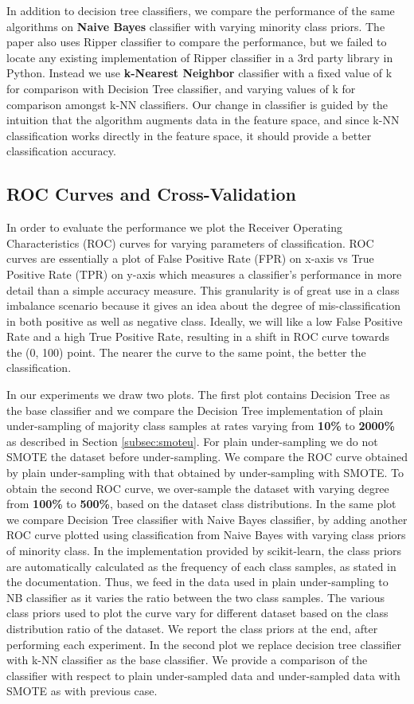 \documentclass[10pt,journal,compsoc]{IEEEtran}
\begin{document}
In addition to decision tree classifiers, we compare the performance of the same algorithms on \textbf{Naive Bayes} classifier with varying minority class priors.
The paper also uses Ripper classifier to compare the performance, but we failed to locate any existing implementation of Ripper classifier in a 3rd party library in Python.
Instead we use \textbf{k-Nearest Neighbor} classifier with a fixed value of k for comparison with Decision Tree classifier, and varying values of k for comparison amongst k-NN classifiers.
Our change in classifier is guided by the intuition that the algorithm augments data in the feature space, and since k-NN classification works directly in the feature space, it should provide a better classification accuracy.

\subsection{ROC Curves and Cross-Validation}
In order to evaluate the performance we plot the Receiver Operating Characteristics (ROC) curves for varying parameters of classification.
ROC curves are essentially a plot of False Positive Rate (FPR) on x-axis vs True Positive Rate (TPR) on y-axis which measures a classifier's performance in more detail than a simple accuracy measure.
This granularity is of great use in a class imbalance scenario because it gives an idea about the degree of mis-classification in both positive as well as negative class.  
Ideally, we will like a low False Positive Rate and a high True Positive Rate, resulting in a shift in ROC curve towards the (0, 100) point. 
The nearer the curve to the same point, the better the classification.

In our experiments we draw two plots. 
The first plot contains Decision Tree as the base classifier and we compare the Decision Tree implementation of plain under-sampling of majority class samples at rates varying from \textbf{10\%} to \textbf{2000\%} as described in Section \ref{subsec:smoteu}. 
For plain under-sampling we do not SMOTE the dataset before under-sampling.
We compare the ROC curve obtained by plain under-sampling with that obtained by under-sampling with SMOTE.
To obtain the second ROC curve, we over-sample the dataset with varying degree from \textbf{100\%} to \textbf{500\%}, based on the dataset class distributions.
In the same plot we compare Decision Tree classifier with Naive Bayes classifier, by adding another ROC curve plotted using classification from Naive Bayes with varying class priors of minority class.
In the implementation provided by scikit-learn, the class priors are automatically calculated as the frequency of each class samples, as stated in the documentation\cite{nbayes}.
Thus, we feed in the data used in plain under-sampling to NB classifier as it varies the ratio between the two class samples. 
The various class priors used to plot the curve vary for different dataset based on the class distribution ratio of the dataset.
We report the class priors at the end, after performing each experiment.
In the second plot we replace decision tree classifier with k-NN classifier as the base classifier. 
We provide a comparison of the classifier with respect to plain under-sampled data and under-sampled data with SMOTE as with previous case.
\end{document}
